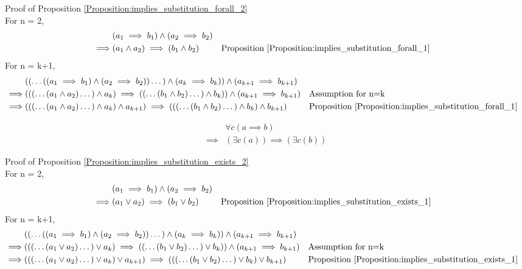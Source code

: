 Proof of Proposition \ref{Proposition:implies_substitution_forall_2} \\
For n = 2,
\begin{align*}
& (a_1 \implies b_1) \land (a_2 \implies b_2) \\
\implies & (a_1 \land a_2) \implies (b_1 \land b_2)
& & \text{Proposition \ref{Proposition:implies_substitution_forall_1}} \\
\end{align*}
For n = k+1,
\begin{align*}
& (( \dots ((a_1 \implies b_1) \land (a_2 \implies b_2)) \dots ) \land (a_k \implies b_k)) \land (a_{k+1} \implies b_{k+1}) \\
\implies & ((( \dots (a_1 \land a_2) \dots ) \land a_k) \implies (( \dots (b_1 \land b_2) \dots ) \land b_k)) \land (a_{k+1} \implies b_{k+1})
& & \text{Assumption for n=k} \\
\implies & ((( \dots (a_1 \land a_2) \dots ) \land a_k) \land a_{k+1}) \implies ((( \dots (b_1 \land b_2) \dots ) \land b_k) \land b_{k+1})
& & \text{Proposition \ref{Proposition:implies_substitution_forall_1}} \\
\end{align*}

\begin{prop}
\label{Proposition:implies_substitution_exists_2}
\begin{align*}
& \forall c (a \implies b) \\
\implies & (\exists c (a)) \implies (\exists c (b))
\end{align*}
\end{prop}

Proof of Proposition \ref{Proposition:implies_substitution_exists_2} \\
For n = 2,
\begin{align*}
& (a_1 \implies b_1) \land (a_2 \implies b_2) \\
\implies & (a_1 \lor a_2) \implies (b_1 \lor b_2)
& & \text{Proposition \ref{Proposition:implies_substitution_exists_1}} \\
\end{align*}
For n = k+1,
\begin{align*}
& (( \dots ((a_1 \implies b_1) \land (a_2 \implies b_2)) \dots ) \land (a_k \implies b_k)) \land (a_{k+1} \implies b_{k+1}) \\
\implies & ((( \dots (a_1 \lor a_2) \dots ) \lor a_k) \implies (( \dots (b_1 \lor b_2) \dots ) \lor b_k)) \land (a_{k+1} \implies b_{k+1})
& & \text{Assumption for n=k} \\
\implies & ((( \dots (a_1 \lor a_2) \dots ) \lor a_k) \lor a_{k+1}) \implies ((( \dots (b_1 \lor b_2) \dots ) \lor b_k) \lor b_{k+1})
& & \text{Proposition \ref{Proposition:implies_substitution_exists_1}} \\
\end{align*}

